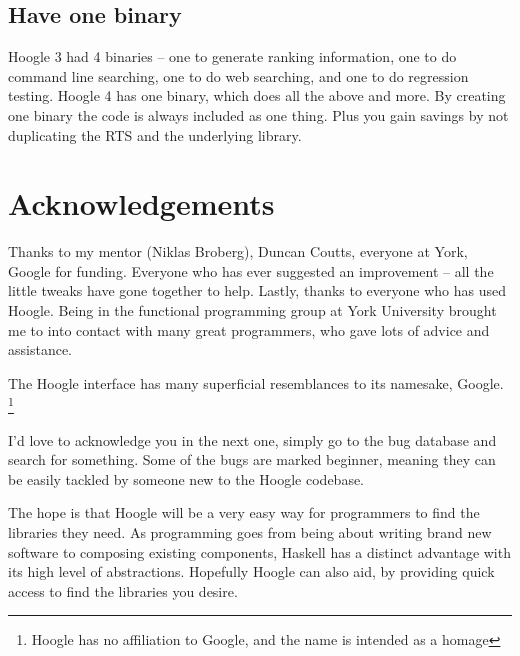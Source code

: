 \documentclass{tmr}
\begin{document}
\subsection{Have one binary}

Hoogle 3 had 4 binaries -- one to generate ranking information, one to do command line searching, one to do web searching, and one to do regression testing. Hoogle 4 has one binary, which does all the above and more. By creating one binary the code is always included as one thing. Plus you gain savings by not duplicating the RTS and the underlying library.

\section{Acknowledgements}

Thanks to my mentor (Niklas Broberg), Duncan Coutts, everyone at York, Google for funding. Everyone who has ever suggested an improvement -- all the little tweaks have gone together to help. Lastly, thanks to everyone who has used Hoogle. Being in the functional programming group at York University brought me to into contact with many great programmers, who gave lots of advice and assistance.

The Hoogle interface has many superficial resemblances to its namesake, Google. \footnote{Hoogle has no affiliation to Google, and the name is intended as a homage}

I'd love to acknowledge you in the next one, simply go to the bug database and search for something. Some of the bugs are marked beginner, meaning they can be easily tackled by someone new to the Hoogle codebase.

The hope is that Hoogle will be a very easy way for programmers to find the libraries they need. As programming goes from being about writing brand new software to composing existing components, Haskell has a distinct advantage with its high level of abstractions. Hopefully Hoogle can also aid, by providing quick access to find the libraries you desire.




\end{document}
